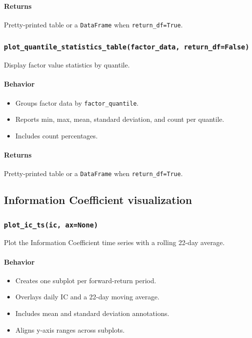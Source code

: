 \documentclass[11pt]{article}
\begin{document}
\paragraph{Returns}
Pretty-printed table or a \texttt{DataFrame} when \texttt{return\_df=True}.

\subsubsection{\texttt{plot\_quantile\_statistics\_table(factor\_data, return\_df=False)}}
Display factor value statistics by quantile.

\paragraph{Behavior}
\begin{itemize}
  \item Groups factor data by \texttt{factor\_quantile}.
  \item Reports min, max, mean, standard deviation, and count per quantile.
  \item Includes count percentages.
\end{itemize}

\paragraph{Returns}
Pretty-printed table or a \texttt{DataFrame} when \texttt{return\_df=True}.

\subsection{Information Coefficient visualization}

\subsubsection{\texttt{plot\_ic\_ts(ic, ax=None)}}
Plot the Information Coefficient time series with a rolling 22-day average.

\paragraph{Behavior}
\begin{itemize}
  \item Creates one subplot per forward-return period.
  \item Overlays daily IC and a 22-day moving average.
  \item Includes mean and standard deviation annotations.
  \item Aligns y-axis ranges across subplots.
\end{itemize}
\end{document}
